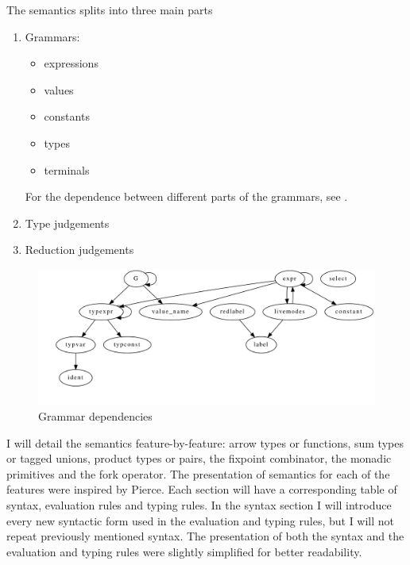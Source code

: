 \documentclass[12pt,twoside,notitlepage]{report}
\begin{document}
The semantics splits into three main parts
\begin{enumerate}
\item{Grammars:\begin{itemize}
\item{expressions}
\item{values}
\item{constants}
\item{types}
\item{terminals}
\end{itemize}
For the dependence between different parts of the grammars, see .}
\item{Type judgements}
\item{Reduction judgements}
\end{enumerate}
\begin{figure}[h]
\begin{center}
\includegraphics[width=\linewidth]{./../mconbaseDep}
\caption{Grammar dependencies}
\label{fig:grammardep}
\end{center}
\end{figure}

I will detail the semantics feature-by-feature: arrow types or functions, sum types or tagged unions, product types or pairs, the fixpoint combinator, the monadic primitives and the fork operator. The presentation of semantics for each of the features were inspired by Pierce\cite{pierce2002types}. Each section will have a corresponding table of syntax, evaluation rules and typing rules.  In the syntax section I will introduce every new syntactic form used in the evaluation and typing rules, but I will not repeat previously mentioned syntax. The presentation of both the syntax and the evaluation and typing rules were slightly simplified for better readability.  
\end{document}
